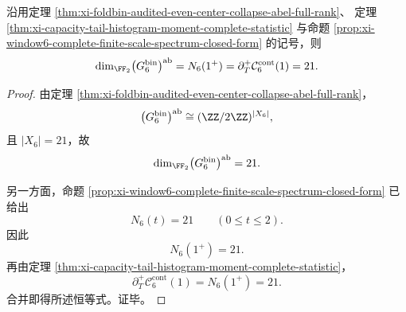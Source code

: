 \begin{theorem}[window-\texorpdfstring{$6$}{6} 异常签名维数等于容量曲线在 \texorpdfstring{$T=1$}{T=1} 的初始右导数]\label{thm:xi-window6-anomaly-rank-initial-capacity-right-derivative}
沿用定理 \ref{thm:xi-foldbin-audited-even-center-collapse-abel-full-rank}、
定理 \ref{thm:xi-capacity-tail-histogram-moment-complete-statistic}
与命题 \ref{prop:xi-window6-complete-finite-scale-spectrum-closed-form} 的记号，则
\[
\dim_{\FF_2}\bigl(G_6^{\mathrm{bin}}\bigr)^{\mathrm{ab}}
=
N_6(1^+)
=
\partial_T^+\mathcal C_6^{\mathrm{cont}}(1)
=
21.
\]
\end{theorem}
\begin{proof}
由定理 \ref{thm:xi-foldbin-audited-even-center-collapse-abel-full-rank}，
\[
\bigl(G_6^{\mathrm{bin}}\bigr)^{\mathrm{ab}}\cong (\ZZ/2\ZZ)^{|X_6|},
\]
且 \(|X_6|=21\)，故
\[
\dim_{\FF_2}\bigl(G_6^{\mathrm{bin}}\bigr)^{\mathrm{ab}}=21.
\]

另一方面，命题 \ref{prop:xi-window6-complete-finite-scale-spectrum-closed-form} 已给出
\[
N_6(t)=21
\qquad(0\le t\le 2).
\]
因此
\[
N_6(1^+)=21.
\]
再由定理 \ref{thm:xi-capacity-tail-histogram-moment-complete-statistic}，
\[
\partial_T^+\mathcal C_6^{\mathrm{cont}}(1)=N_6(1^+)=21.
\]
合并即得所述恒等式。证毕。
\end{proof}

\endinput
